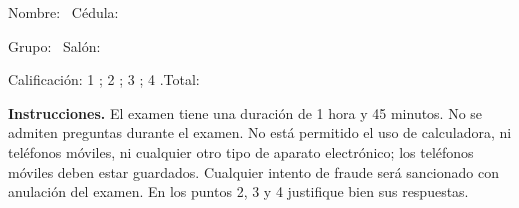 \documentclass[11pt]{article}
\begin{document}
\examheader

\vspace{4pt}
\noindent Nombre: \dotfill\ Cédula: \dotfill

\vspace{4pt}
\noindent Grupo: \dotfill\ Salón: \dotfill

\vspace{4pt}
\noindent Calificación: 1 \dotfill; 2 \dotfill; 3 \dotfill; 4 \dotfill.\quad Total: \dotfill

\vspace{6pt}
\noindent\textbf{Instrucciones.} El examen tiene una duración de 1 hora y 45 minutos. No se admiten preguntas durante el examen. No está permitido el uso de calculadora, ni teléfonos móviles, ni cualquier otro tipo de aparato electrónico; los teléfonos móviles deben estar guardados. Cualquier intento de fraude será sancionado con anulación del examen. En los puntos 2, 3 y 4 justifique bien sus respuestas.
\end{document}
